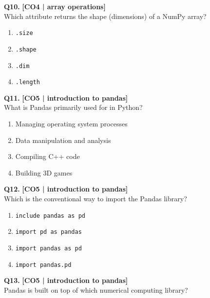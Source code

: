 \noindent\textbf{Q10.} \hfill {\small\color{LPUOrange}\textbf{[CO4 | array operations]}}\\[2pt]
Which attribute returns the shape (dimensions) of a NumPy array?

\begin{enumerate}[label=(\alph*),topsep=2pt,itemsep=1pt,partopsep=0pt,parsep=0pt]
    \item \relax \texttt{.size}
    \item \relax \texttt{.shape}
    \item \relax \texttt{.dim}
    \item \relax \texttt{.length}
\end{enumerate}
\vspace{{2mm}}

\noindent\textbf{Q11.} \hfill {\small\color{LPUOrange}\textbf{[CO5 | introduction to pandas]}}\\[2pt]
What is Pandas primarily used for in Python?

\begin{enumerate}[label=(\alph*),topsep=2pt,itemsep=1pt,partopsep=0pt,parsep=0pt]
    \item \relax Managing operating system processes
    \item \relax Data manipulation and analysis
    \item \relax Compiling C++ code
    \item \relax Building 3D games
\end{enumerate}
\vspace{{2mm}}

\noindent\textbf{Q12.} \hfill {\small\color{LPUOrange}\textbf{[CO5 | introduction to pandas]}}\\[2pt]
Which is the conventional way to import the Pandas library?

\begin{enumerate}[label=(\alph*),topsep=2pt,itemsep=1pt,partopsep=0pt,parsep=0pt]
    \item \relax \texttt{include pandas as pd}
    \item \relax \texttt{import pd as pandas}
    \item \relax \texttt{import pandas as pd}
    \item \relax \texttt{import pandas.pd}
\end{enumerate}
\vspace{{2mm}}

\noindent\textbf{Q13.} \hfill {\small\color{LPUOrange}\textbf{[CO5 | introduction to pandas]}}\\[2pt]
Pandas is built on top of which numerical computing library?

